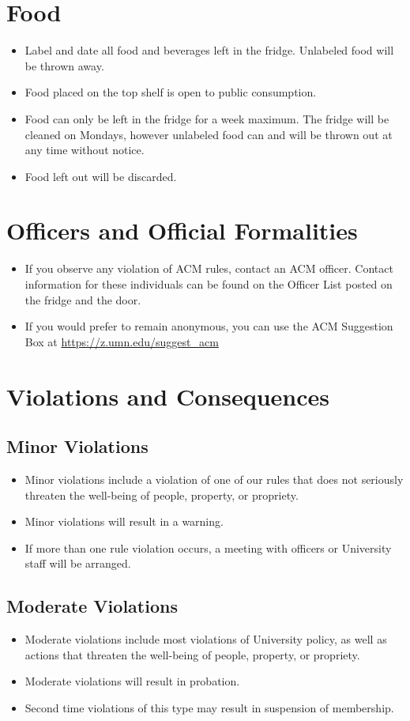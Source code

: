\section{Food}
\begin{itemize}
	\item Label and date all food and beverages left in the fridge. Unlabeled food will be thrown away.
	\item Food placed on the top shelf is open to public consumption.
	\item Food can only be left in the fridge for a week maximum. The fridge will be cleaned on Mondays, however unlabeled food can and will be thrown out at any time without notice.
	\item Food left out will be discarded.
\end{itemize}

\section{Officers and Official Formalities}
\begin{itemize}
	\item If you observe any violation of ACM rules, contact an ACM officer. Contact information for these individuals can be found on the Officer List posted on the fridge and the door.
	\item If you would prefer to remain anonymous, you can use the ACM Suggestion Box at \url{https://z.umn.edu/suggest_acm}
\end{itemize}

\section{Violations and Consequences}
\subsection{Minor Violations}
\begin{itemize}
	\item Minor violations include a violation of one of our rules that does not seriously threaten the well-being of people, property, or propriety.
	\item Minor violations will result in a warning.
	\item If more than one rule violation occurs, a meeting with officers or University staff will be arranged.
\end{itemize}

\subsection{Moderate Violations}
\begin{itemize}
	\item Moderate violations include most violations of University policy, as well as actions that threaten the well-being of people, property, or propriety.
	\item Moderate violations will result in probation.
	\item Second time violations of this type may result in suspension of membership.
\end{itemize}

